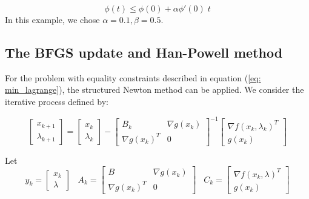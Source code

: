 \begin{equation}
\phi(t) \le \phi(0) + \alpha \phi'(0)\;t
\label{eq: Armijo_1}
\end{equation}
\noindent In this example, we chose $ \alpha = 0.1, \beta = 0.5 $.

\subsection{The BFGS update and Han-Powell method}

\vspace{0.15 in}
\noindent\hspace{0.5 in}
For the problem with equality constraints described in equation (\ref{eq: min_lagrange}),
the structured Newton method can be applied.
We consider the iterative process defined by:

\begin{equation}
\left [
\begin{array}{c}
x_{k+1}      \\
\lambda_{k+1}
\end{array}
\right ] = \left [
\begin{array}{c}
x_k \\
\lambda_k 
\end{array} \right ]  - \left [
\begin{array}{cc}
B_k & \nabla g(x_k)\\
\nabla g(x_k)^T  & 0 
\end{array} \right ]^{-1} \left [
\begin{array}{c}
\nabla f(x_k, \lambda_k)^T\\
g(x_k)
\end{array}
\right ]
\label{eq: Struct_Newton}
\end{equation}

\vspace{0.15 in}\noindent 
Let
\[ y_k = \left [ \begin{array}{c}
                x_k \\
                \lambda
               \end{array}
       \right ]  \;\;\; A_k = \left [
                                  \begin{array}{cc}
                                  B & \nabla g(x_k)\\
                                  \nabla g(x_k)^T  & 0
                                  \end{array} \right ] \;\;\; C_k = \left [
                                                   \begin{array}{c}
                                                   \nabla f(x_k, \lambda)^T\\
                                                    g(x_k)
                                                   \end{array}
                                                   \right ] \]

